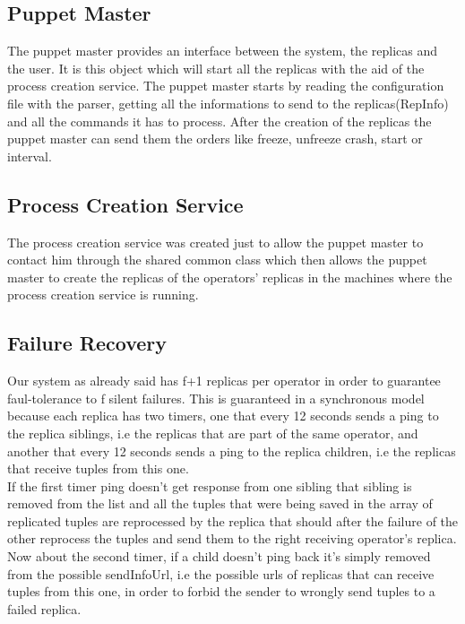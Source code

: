 \documentclass[times, 10pt, twocolumn]{article}
\begin{document}
\subsection{Puppet Master}
The puppet master provides an interface between the system, the replicas and the user.
It is this object which will start all the replicas with the aid of the process creation service.
The puppet master starts by reading the configuration file with the parser, getting all the informations to send to the replicas(RepInfo) and all the commands it has to process. After the creation of the replicas the puppet master can send them the orders like freeze, unfreeze crash, start or interval.




\subsection{Process Creation Service}
The process creation service was created just to allow the puppet master to contact him through the shared common class which then allows the puppet master to create the replicas of the operators' replicas in the machines where the process creation service is running.



\subsection{Failure Recovery}
Our system as already said has f+1 replicas per operator in order to guarantee faul-tolerance to f silent failures. This is guaranteed in a synchronous model because each replica has two timers, one that every 12 seconds sends a ping to the replica siblings, i.e the replicas that are part of the same operator, and another that every 12 seconds sends a ping to the replica children, i.e the replicas that receive tuples from this one.
\\If the first timer ping doesn't get response from one sibling that sibling is removed from the list and all the tuples that were being saved in the array of replicated tuples are reprocessed by the replica that should after the failure of the other reprocess the tuples and send them to the right receiving operator's replica.
\\Now about the second timer, if a child doesn't ping back it's simply removed from the possible sendInfoUrl, i.e the possible urls of replicas that can receive tuples from this one, in order to forbid the sender to wrongly send tuples to a failed replica.
\end{document}
